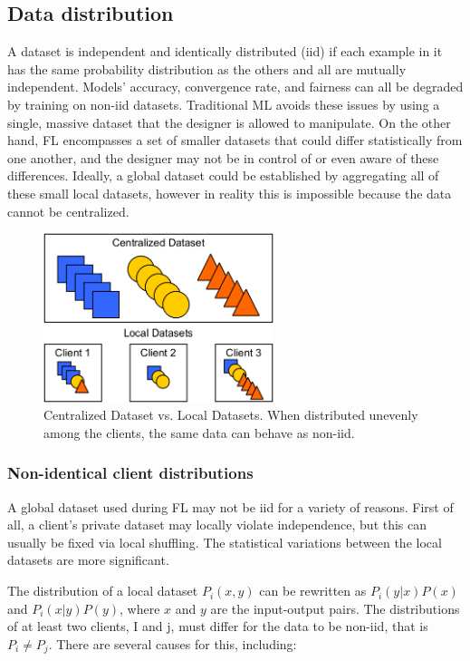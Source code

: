 \subsection{Data distribution}
A dataset is independent and identically distributed (iid) if each example in it has the same probability distribution as the others and all are mutually independent. Models' accuracy, convergence rate, and fairness can all be degraded by training on non-iid datasets. Traditional ML avoids these issues by using a single, massive dataset that the designer is allowed to manipulate. On the other hand, FL encompasses a set of smaller datasets that could differ statistically from one another, and the designer may not be in control of or even aware of these differences. Ideally, a global dataset could be established by aggregating all of these small local datasets, however in reality this is impossible because the data cannot be centralized.

\begin{figure}[H]
    \centering
        \includegraphics[width=0.6\textwidth]{Images/block_diagrams/data_distribution.png}
        \decoRule
        \caption[Data distribution]{Centralized Dataset vs. Local Datasets. When distributed unevenly among the clients, the same data can behave as non-iid.}
        \label{fig:Data distribution}
\end{figure}

\subsubsection{Non-identical client distributions}
A global dataset used during FL may not be iid for a variety of reasons. First of all, a client's private dataset may locally violate independence, but this can usually be fixed via local shuffling. The statistical variations between the local datasets are more significant.

The distribution of a local dataset \(P_i(x,y)\) can be rewritten as \(P_i(y|x)P(x)\) and \(P_i(x|y)P(y)\), where \(x\) and \(y\) are the input-output pairs. The distributions of at least two clients, I and j, must differ for the data to be non-iid, that is \(P_i \neq P_j\). There are several causes for this, including:


